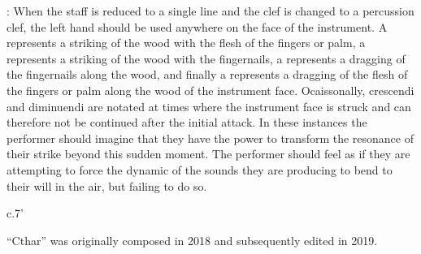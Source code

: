 \documentclass[10pt]{article}
\begin{document}
\begingroup
\begin{center}
: When the staff is reduced to a single line and the clef is changed to a percussion clef, the left hand should be used anywhere on the face of the instrument. A  represents a striking of the wood with the flesh of the fingers or palm, a  represents a striking of the wood with the fingernails, a  represents a dragging of the fingernails along the wood, and finally a  represents a dragging of the flesh of the fingers or palm along the wood of the instrument face. Ocaissonally,  crescendi and diminuendi are notated at times where the instrument face is struck and can therefore not be continued after the initial attack. In these instances the performer should imagine that they have the power to transform the resonance of their strike beyond this sudden moment. The performer should feel as if they are attempting to force the dynamic of the sounds they are producing to bend to their will in the air, but failing to do so.
\rightskip\leftskip
\phantom{text} \hfill \phantom{()}
\end{center}
\endgroup

\vspace*{5\baselineskip}

\begin{center}
c.7'
\end{center}

\vspace*{5\baselineskip}

\begin{center}
``Cthar'' was originally composed in 2018 and subsequently edited in 2019.
\end{center}
\end{document}
